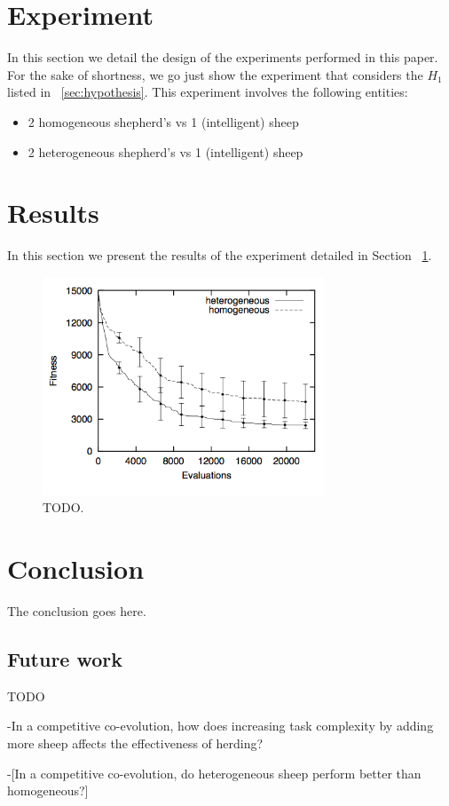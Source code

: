 \documentclass[conference]{IEEEtran}
\begin{document}
\section{Experiment}
\label{sec:experiment}
In this section we detail the design of the experiments performed in this paper.
For the sake of shortness, we go just show the experiment that considers the $H_1$ listed in ~\ref{sec:hypothesis}.
This experiment involves the following entities:
\begin{itemize}
	\item 2 homogeneous shepherd’s vs 1 (intelligent) sheep
	\item 2 heterogeneous shepherd’s vs 1 (intelligent) sheep
\end{itemize}


\section{Results}
In this section we present the results of the experiment detailed in Section ~\ref{sec:experiment}.

\begin{figure}[ht]
\centering
\includegraphics[width=3.3in]{imgs/homo_vs_hetero.png}
\caption{TODO.}
\label{fig:homo_vs_hetero}
\end{figure}

\section{Conclusion}
The conclusion goes here.

\subsection{Future work}
TODO

-In a competitive co-evolution, how does increasing task complexity by adding more sheep affects the effectiveness of herding? %

-[In a competitive co-evolution, do heterogeneous sheep perform better than homogeneous?] %





\end{document}
